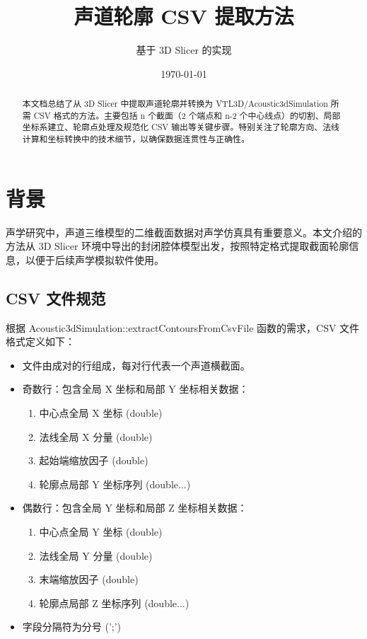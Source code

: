 \documentclass[12pt,a4paper]{article}
\title{声道轮廓 CSV 提取方法}
\author{基于 3D Slicer 的实现}
\date{\today}
\begin{document}
\maketitle

\begin{abstract}
本文档总结了从 3D Slicer 中提取声道轮廓并转换为 VTL3D/Acoustic3dSimulation 所需 CSV 格式的方法。主要包括 n 个截面（2 个端点和 n-2 个中心线点）的切割、局部坐标系建立、轮廓点处理及规范化 CSV 输出等关键步骤。特别关注了轮廓方向、法线计算和坐标转换中的技术细节，以确保数据连贯性与正确性。
\end{abstract}

\section{背景}

声学研究中，声道三维模型的二维截面数据对声学仿真具有重要意义。本文介绍的方法从 3D Slicer 环境中导出的封闭腔体模型出发，按照特定格式提取截面轮廓信息，以便于后续声学模拟软件使用。

\subsection{CSV 文件规范}

根据 Acoustic3dSimulation::extractContoursFromCsvFile 函数的需求，CSV 文件格式定义如下：

\begin{itemize}
  \item 文件由成对的行组成，每对行代表一个声道横截面。
  \item 奇数行：包含全局 X 坐标和局部 Y 坐标相关数据：
    \begin{enumerate}
      \item 中心点全局 X 坐标 (double)
      \item 法线全局 X 分量 (double)
      \item 起始端缩放因子 (double)
      \item 轮廓点局部 Y 坐标序列 (double...)
    \end{enumerate}
  \item 偶数行：包含全局 Y 坐标和局部 Z 坐标相关数据：
    \begin{enumerate}
      \item 中心点全局 Y 坐标 (double)
      \item 法线全局 Y 分量 (double)
      \item 末端缩放因子 (double)
      \item 轮廓点局部 Z 坐标序列 (double...)
    \end{enumerate}
  \item 字段分隔符为分号 (';')
\end{itemize}
\end{document}
